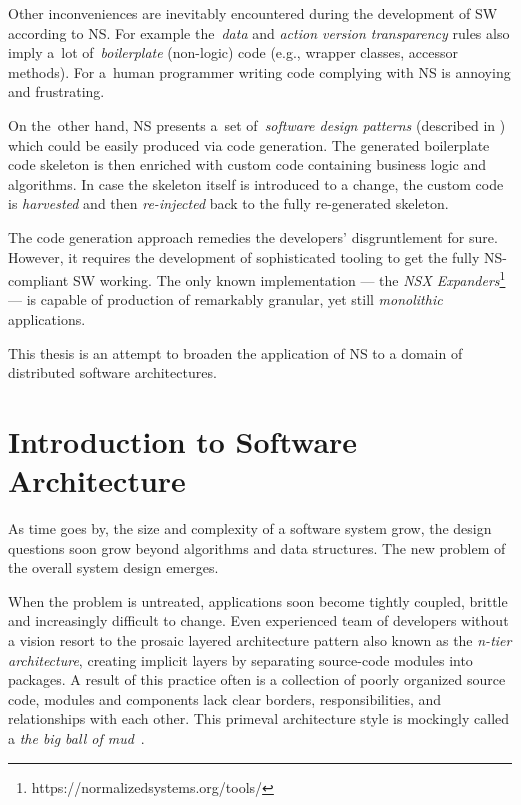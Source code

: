 \documentclass[thesis=M,english,hidelinks]{FITthesis}[2012/10/20]
\begin{document}
Other inconveniences are inevitably encountered during the development of \acrshort{SW} according to \acrshort{NS}. For example the~\emph{data} and \emph{action version transparency} rules also imply a~lot of~\textit{boilerplate} (non-logic) code (e.g., wrapper classes, accessor methods). For a~human programmer writing code complying with \acrshort{NS} is annoying and frustrating.

On the~other hand, \acrshort{NS} presents a~set of~\emph{software design patterns} (described in \cite{ns-recreating}) which could be easily produced via code generation. The generated boilerplate code skeleton is then enriched with custom code containing business logic and algorithms. In case the skeleton itself is introduced to a change, the custom code is \textit{harvested} and then \textit{re-injected} back to the fully re-generated skeleton.~\cite{vk-bp}

The code generation approach remedies the developers' disgruntlement for sure. However, it requires the development of sophisticated tooling to get the fully \acrshort{NS}-compliant \acrlong{SW} working. The only known implementation --- the \textit{NSX Expanders}\footnote{https://normalizedsystems.org/tools/} --- is capable of production of remarkably granular, yet still \textit{monolithic} applications.

This thesis is an attempt to broaden the application of \acrlong{NS} to a domain of distributed software architectures.

% 
% 
\section{Introduction to Software Architecture}
As time goes by, the size and complexity of a software system grow, the design questions soon grow beyond algorithms and data structures. The new problem of the overall system design emerges.

When the problem is untreated, applications soon become tightly coupled, brittle and increasingly difficult to change. Even experienced team of developers without a vision resort to the prosaic layered architecture pattern also known as the \textit{n-tier architecture}, creating implicit layers by separating source-code modules into packages. A result of this practice often is a collection of poorly organized source code, modules and components lack clear borders, responsibilities, and relationships with each other. This primeval architecture style is mockingly called a \textit{the big ball of mud}~\cite{big-ball-mud}.
\end{document}
